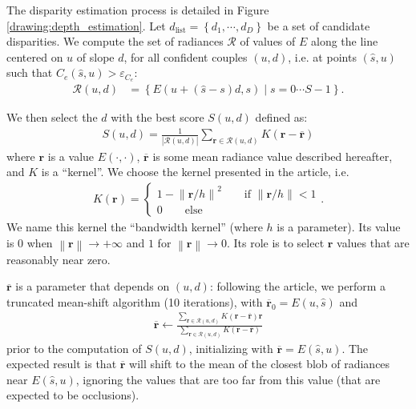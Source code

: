 \documentclass{article}
\newcommand{\abs} [1] {\left| #1 \right|}
\newcommand{\norm}[1]{\left\lVert#1\right\rVert}
\theoremstyle{definition}
\begin{document}
The disparity estimation process is detailed in Figure \ref{drawing:depth_estimation}. Let $d_\text{list} = \left\{d_1, \cdots, d_D \right\}$ be a set of candidate disparities. We compute the set of radiances $\mathcal{R}$ of values of $E$ along the line centered on $u$ of slope $d$, for all confident couples $(u, d)$, i.e. at points $(\widehat{s}, u)$ such that $C_e(\widehat{s}, u) > \varepsilon_{C_e}$:
\begin{align} 
\mathcal{R}(u, d) &= \left\{ E(u + (\widehat{s} - s) d, s) \; | \; s = 0 \cdots S-1 \right\}.
\end{align}

We then select the $d$ with the best score $S(u, d)$ defined as:
\begin{align} 
S(u, d) = \frac{1}{\abs{\mathcal{R}(u, d)}} \sum_{\mathbf{r} \in \mathcal{R}(u, d)} K(\mathbf{r} - \overline{\mathbf{r}})
\end{align}
where $\mathbf{r}$ is a value $E(\cdot, \cdot)$, $\overline{\mathbf{r}}$ is some mean radiance value described hereafter, and $K$ is a ``kernel''. We choose the kernel presented in the article, i.e.
\begin{align}
K(\mathbf{r}) = \left\{ 
\begin{array}{l}
1 - \norm{\mathbf{r} / h}^2 \qquad \text{if $\norm{\mathbf{r} / h} < 1$} \\
0 \qquad \text{else}                            
\end{array} \right. .
\end{align}
We name this kernel the ``bandwidth kernel'' (where $h$ is a parameter). Its value is $0$ when $\norm{\mathbf{r}} \rightarrow +\infty$ and $1$ for $\norm{\mathbf{r}} \rightarrow 0$. Its role is to select $\mathbf{r}$ values that are reasonably near zero.

$\overline{\mathbf{r}}$ is a parameter that depends on $(u, d)$: following the article, we perform a truncated mean-shift algorithm (10 iterations), with $\overline{\mathbf{r}}_0 = E(u, \widehat{s})$ and
\begin{align} 
\overline{\mathbf{r}} \leftarrow \frac{\sum_{\mathbf{r} \in \mathcal{R}(u, d)} K(\mathbf{r} - \overline{\mathbf{r}}) \mathbf{r}}{\sum_{\mathbf{r} \in \mathcal{R}(u, d)} K(\mathbf{r} - \overline{\mathbf{r}})}
\end{align}
prior to the computation of $S(u, d)$, initializing with $\overline{\mathbf{r}} = E(\widehat{s}, u)$. The expected result is that $\overline{\mathbf{r}}$ will shift to the mean of the closest blob of radiances near $E(\widehat{s}, u)$, ignoring the values that are too far from this value (that are expected to be occlusions).
\end{document}
